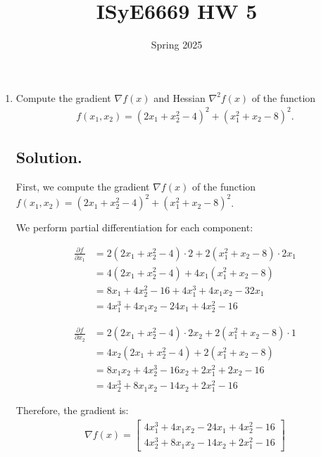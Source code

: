 \documentclass[11pt]{article}
\title{ISyE6669 HW 5}
\author{}
\date{Spring 2025}
\begin{document}
\maketitle



\begin{enumerate}

\item Compute the gradient $\nabla f(x)$ and Hessian $\nabla^2 f(x)$ of the function
    \begin{align*}
        f(x_1, x_2) = (2x_1 + x_2^2 - 4)^2 + (x_1^2 + x_2 - 8)^2.
    \end{align*}

\subsection*{Solution.}

First, we compute the gradient $\nabla f(x)$ of the function $f(x_1, x_2) = (2x_1 + x_2^2 - 4)^2 + (x_1^2 + x_2 - 8)^2$.

We perform partial differentiation for each component:

\begin{align}
\frac{\partial f}{\partial x_1} &= 2(2x_1 + x_2^2 - 4) \cdot 2 + 2(x_1^2 + x_2 - 8) \cdot 2x_1 \\
&= 4(2x_1 + x_2^2 - 4) + 4x_1(x_1^2 + x_2 - 8) \\
&= 8x_1 + 4x_2^2 - 16 + 4x_1^3 + 4x_1x_2 - 32x_1 \\
&= 4x_1^3 + 4x_1x_2 - 24x_1 + 4x_2^2 - 16
\end{align}

\begin{align}
\frac{\partial f}{\partial x_2} &= 2(2x_1 + x_2^2 - 4) \cdot 2x_2 + 2(x_1^2 + x_2 - 8) \cdot 1 \\
&= 4x_2(2x_1 + x_2^2 - 4) + 2(x_1^2 + x_2 - 8) \\
&= 8x_1x_2 + 4x_2^3 - 16x_2 + 2x_1^2 + 2x_2 - 16 \\
&= 4x_2^3 + 8x_1x_2 - 14x_2 + 2x_1^2 - 16
\end{align}

Therefore, the gradient is:
\begin{align}
\nabla f(x) = \begin{bmatrix}
4x_1^3 + 4x_1x_2 - 24x_1 + 4x_2^2 - 16 \\
4x_2^3 + 8x_1x_2 - 14x_2 + 2x_1^2 - 16
\end{bmatrix}
\end{align}


\end{enumerate}
\end{document}
